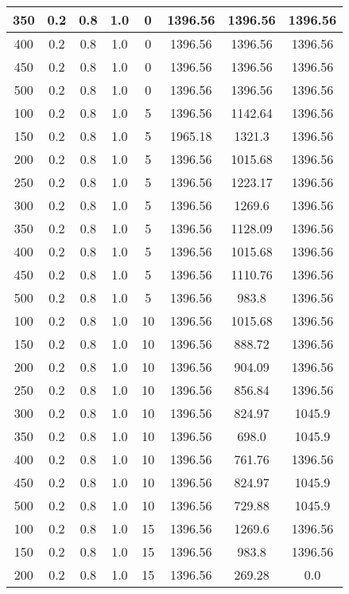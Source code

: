 \documentclass[a4paper, 12pt]{extreport}
\begin{document}
\begin{itemize}
\begin{longtable}{|c|c|c|c|c|c|c|c|}
			350 & 0.2 & 0.8 & 1.0 & 0 & 1396.56 & 1396.56 & 1396.56 \\\hline
			400 & 0.2 & 0.8 & 1.0 & 0 & 1396.56 & 1396.56 & 1396.56 \\\hline
			450 & 0.2 & 0.8 & 1.0 & 0 & 1396.56 & 1396.56 & 1396.56 \\\hline
			500 & 0.2 & 0.8 & 1.0 & 0 & 1396.56 & 1396.56 & 1396.56 \\\hline
			100 & 0.2 & 0.8 & 1.0 & 5 & 1396.56 & 1142.64 & 1396.56 \\\hline
			150 & 0.2 & 0.8 & 1.0 & 5 & 1965.18 & 1321.3 & 1396.56 \\\hline
			200 & 0.2 & 0.8 & 1.0 & 5 & 1396.56 & 1015.68 & 1396.56 \\\hline
			250 & 0.2 & 0.8 & 1.0 & 5 & 1396.56 & 1223.17 & 1396.56 \\\hline
			300 & 0.2 & 0.8 & 1.0 & 5 & 1396.56 & 1269.6 & 1396.56 \\\hline
			350 & 0.2 & 0.8 & 1.0 & 5 & 1396.56 & 1128.09 & 1396.56 \\\hline
			400 & 0.2 & 0.8 & 1.0 & 5 & 1396.56 & 1015.68 & 1396.56 \\\hline
			450 & 0.2 & 0.8 & 1.0 & 5 & 1396.56 & 1110.76 & 1396.56 \\\hline
			500 & 0.2 & 0.8 & 1.0 & 5 & 1396.56 & 983.8 & 1396.56 \\\hline
			100 & 0.2 & 0.8 & 1.0 & 10 & 1396.56 & 1015.68 & 1396.56 \\\hline
			150 & 0.2 & 0.8 & 1.0 & 10 & 1396.56 & 888.72 & 1396.56 \\\hline
			200 & 0.2 & 0.8 & 1.0 & 10 & 1396.56 & 904.09 & 1396.56 \\\hline
			250 & 0.2 & 0.8 & 1.0 & 10 & 1396.56 & 856.84 & 1396.56 \\\hline
			300 & 0.2 & 0.8 & 1.0 & 10 & 1396.56 & 824.97 & 1045.9 \\\hline
			350 & 0.2 & 0.8 & 1.0 & 10 & 1396.56 & 698.0 & 1045.9 \\\hline
			400 & 0.2 & 0.8 & 1.0 & 10 & 1396.56 & 761.76 & 1396.56 \\\hline
			450 & 0.2 & 0.8 & 1.0 & 10 & 1396.56 & 824.97 & 1045.9 \\\hline
			500 & 0.2 & 0.8 & 1.0 & 10 & 1396.56 & 729.88 & 1045.9 \\\hline
			100 & 0.2 & 0.8 & 1.0 & 15 & 1396.56 & 1269.6 & 1396.56 \\\hline
			150 & 0.2 & 0.8 & 1.0 & 15 & 1396.56 & 983.8 & 1396.56 \\\hline
			200 & 0.2 & 0.8 & 1.0 & 15 & 1396.56 & 269.28 & 0.0 \\\hline

\end{longtable}
\end{itemize}
\end{document}
